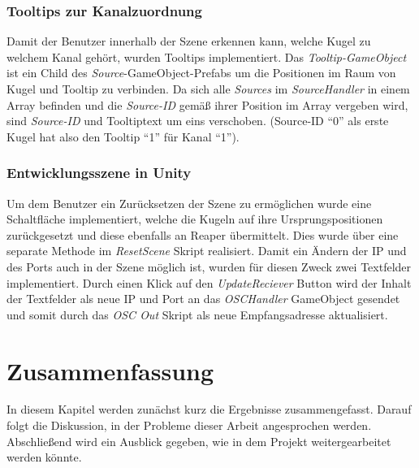 \documentclass[11pt, titlepage, fleqn]{report}
\begin{document}
            \subsection{Tooltips zur Kanalzuordnung}
            \label{sec:3.3.4}
                Damit der Benutzer innerhalb der Szene erkennen kann, welche 
                Kugel zu welchem Kanal gehört, wurden Tooltips implementiert. 
                Das \textit{Tooltip-GameObject} ist ein Child des \textit{Source}-GameObject-Prefabs um die Positionen im Raum 
                von Kugel und Tooltip zu verbinden. Da sich alle \textit{Sources} im \textit{SourceHandler} in 
                einem Array befinden und die \textit{Source-ID} gemäß ihrer Position im Array vergeben wird, 
                sind \textit{Source-ID} und Tooltiptext um eins verschoben. (Source-ID “0” als erste Kugel hat also den Tooltip “1” für Kanal “1”).   
            \subsection{Entwicklungsszene in Unity}
            \label{sec:3.2.5}
                Um dem Benutzer ein Zurücksetzen der Szene zu ermöglichen wurde 
                eine Schaltfläche implementiert, welche die Kugeln auf ihre 
                Ursprungspositionen zurückgesetzt und diese ebenfalls an Reaper 
                übermittelt. Dies wurde über eine separate Methode im 
                \textit{ResetScene} Skript realisiert. Damit ein Ändern der IP 
                und des Ports auch in der Szene 
                möglich ist, wurden für diesen Zweck zwei Textfelder implementiert. Durch einen Klick auf den \textit{UpdateReciever} Button wird der 
                Inhalt der Textfelder als neue IP und Port an das \textit{OSCHandler} GameObject 
                gesendet und somit durch das \textit{OSC Out} Skript als neue Empfangsadresse aktualisiert.
    \chapter{Zusammenfassung}%
    \label{sec:org12d8e10}
    In diesem Kapitel werden zunächst kurz die Ergebnisse zusammengefasst. 
    Darauf folgt die Diskussion, in der Probleme dieser Arbeit angesprochen 
    werden. Abschließend wird ein Ausblick gegeben, wie in dem Projekt 
    weitergearbeitet werden könnte.
\end{document}

